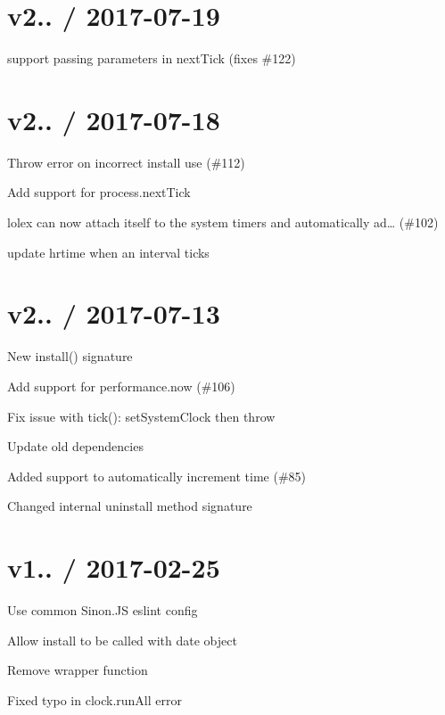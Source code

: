 \section*{v2.. / 2017-\/07-\/19 }


\begin{DoxyItemize}
\item support passing parameters in next\+Tick (fixes \#122)
\end{DoxyItemize}

\section*{v2.. / 2017-\/07-\/18 }


\begin{DoxyItemize}
\item Throw error on incorrect install use (\#112)
\item Add support for process.\+next\+Tick
\item lolex can now attach itself to the system timers and automatically ad… (\#102)
\item update hrtime when an interval ticks
\end{DoxyItemize}

\section*{v2.. / 2017-\/07-\/13 }


\begin{DoxyItemize}
\item New install() signature
\item Add support for performance.\+now (\#106)
\item Fix issue with tick()\+: set\+System\+Clock then throw
\item Update old dependencies
\item Added support to automatically increment time (\#85)
\item Changed internal uninstall method signature
\end{DoxyItemize}

\section*{v1.. / 2017-\/02-\/25 }


\begin{DoxyItemize}
\item Use common Sinon.\+JS eslint config
\item Allow install to be called with date object
\item Remove wrapper function
\item Fixed typo in clock.\+run\+All error
\end{DoxyItemize}

